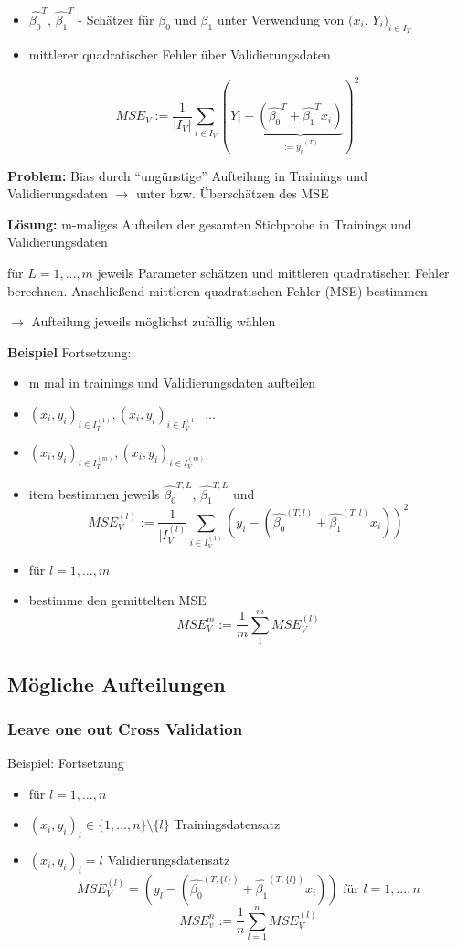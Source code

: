 \documentclass[10pt]{report}
\theoremstyle{definition}
\begin{document}
\begin{itemize}
	\item $ \hat{\beta_0}^T $, $ \hat{\beta_1}^T $ - Schätzer für $\beta_0$ und  $\beta_1$ unter Verwendung von $ (x_i $, $ Y_i $$ )_{i \in I_T} $
	\item mittlerer quadratischer Fehler über Validierungsdaten
\end{itemize}

\[MSE_V := \frac{1}{|I_V|} \sum_{i \in I_V}(Y_i - \underbrace{(  \hat{\beta_0}^T +  \hat{\beta_1}^T x_i)}_{:= \hat{y_i}^{(T)}})^2\]

\textbf{Problem:} Bias durch "`ungünstige"' Aufteilung in Trainings und Validierungsdaten $\rightarrow$
unter bzw. Überschätzen des MSE

\textbf{Lösung:} m-maliges Aufteilen der gesamten Stichprobe in Trainings und Validierungsdaten

für \(L=1,\ldots, m\) jeweils Parameter schätzen und mittleren quadratischen Fehler berechnen. Anschließend mittleren quadratischen Fehler (MSE) bestimmen

$\rightarrow$ Aufteilung jeweils möglichst zufällig wählen

\textbf{Beispiel} Fortsetzung:
\begin{itemize}
	\item m mal in trainings und Validierungsdaten aufteilen
	\item $ (x_i, y_i)_{i \in I_T^{(1)}} , (x_i,y_i)_{i \in I_V^{(1)}} $ $ \ldots $
	\item $ (x_i, y_i)_{i \in I_T^{(m)} }, (x_i,y_i)_{i \in I_V^{(m)}} $
	\item item bestimmen jeweils  $\hat{\beta_0}^{T,L}$, $\hat{\beta_1}^{T,L}$ und 
	\[ MSE_V^{(l)} := \frac{1}{|I_V^{(l)}} \sum_{i \in I_V^{(1)}}(y_i - (\hat{\beta_0}^{(T,l)} + \hat{\beta_1}^{(T,l)} x_i))^2  \]
	\item für $l = 1, \ldots, m$
	\item bestimme den gemittelten MSE
	\[MSE_V^m := \frac{1}{m} \sum_{1}^{m} MSE_V^{(l)}\]
\end{itemize}

\subsection{Mögliche Aufteilungen}
\subsubsection{Leave one out Cross Validation}
Beispiel: Fortsetzung
\begin{itemize}
	\item für \(l = 1,\ldots,n\) 
	\item $(x_i, y_i)_i \in \{1, \ldots, n \} \setminus \{l\}$ Trainingsdatensatz
	\item $(x_i, y_i)_i = l$ Validierungsdatensatz
	\[MSE_V^{(l)} = (y_l - (\hat{\beta_0}^{(T, \{l\})} + \hat{\beta_1}^{(T, \{l\})} x_i)) \text{ für } l = 1,\ldots ,n\]	
	\[MSE_v^n := \frac{1}{n}\sum_{l = 1}^{n} MSE_V^{(l)}\]
\end{itemize}
\end{document}
